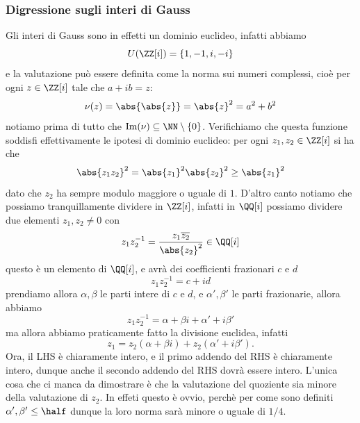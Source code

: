 \documentclass[11pt]{scrartcl}
\newcommand{\Immagine}[1]{\text{Im}\!\left(#1\right)}
\begin{document}
	\subsubsection{Digressione sugli interi di Gauss}
	Gli interi di Gauss sono in effetti un dominio euclideo, infatti abbiamo $$U(\ZZ[i])=\left\{1,-1,i,-i\right\}$$
	e la valutazione può essere definita come la norma sui numeri complessi, cioè per ogni $z\in\ZZ[i]$ tale che $a+ib=z$:
	$$\nu(z)=\abs{\abs{z}}=\abs{z}^2=a^2+b^2$$
	notiamo prima di tutto che $\Immagine{\nu}\subseteq \NN\setminus\left\{0\right\}$. Verifichiamo che questa funzione soddisfi effettivamente le ipotesi di dominio euclideo: per ogni $z_1,z_2\in \ZZ[i]$ si ha che
	$$\abs{z_1z_2}^2=\abs{z_1}^2\abs{z_2}^2\ge \abs{z_1}^2$$
	dato che $z_2$ ha sempre modulo maggiore o uguale di $1$. D'altro canto notiamo che possiamo tranquillamente dividere in $\ZZ[i]$, infatti in $\QQ[i]$ possiamo dividere due elementi $z_1,z_2\ne 0$ con
	$$z_1z_2^{-1}=\frac{z_1\overline{z_2}}{\abs{z_2}^2}\in \QQ[i]$$
	questo è un elemento di $\QQ[i]$, e avrà dei coefficienti frazionari $c$ e $d$
	$$z_1z_2^{-1}=c+id$$
	prendiamo allora $\alpha,\beta$ le parti intere di $c$ e $d$, e $\alpha',\beta'$ le parti frazionarie, allora abbiamo
	$$z_1z_2^{-1}=\alpha +\beta i +\alpha'+i\beta'$$
	ma allora abbiamo praticamente fatto la divisione euclidea, infatti
	$$z_1=z_2\left(\alpha+\beta i\right)+z_2\left(\alpha'+i\beta'\right).$$
	Ora, il LHS è chiaramente intero, e il primo addendo del RHS è chiaramente intero, dunque anche il secondo addendo del RHS dovrà essere intero. L'unica cosa che ci manca da dimostrare è che la valutazione del quoziente sia minore della valutazione di $z_2$. In effeti questo è ovvio, perchè per come sono definiti $\alpha',\beta'\le \half$ dunque la loro norma sarà minore o uguale di $1/4$.
\end{document}
